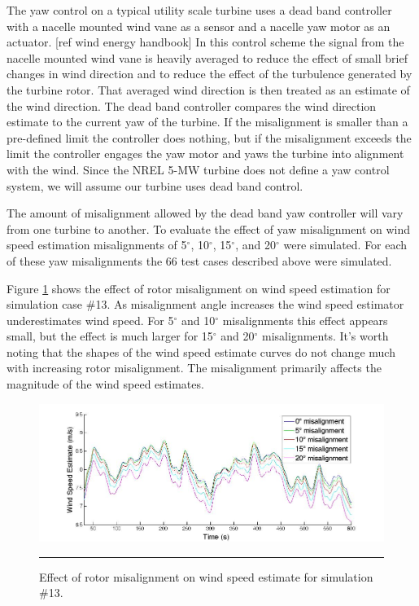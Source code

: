 The yaw control on a typical utility scale turbine uses a dead band controller with a nacelle mounted wind vane as a sensor and a nacelle yaw motor as an actuator. [ref wind energy handbook] In this control scheme the signal from the nacelle mounted wind vane is heavily averaged to reduce the effect of small brief changes in wind direction and to reduce the effect of the turbulence generated by the turbine rotor. That averaged wind direction is then treated as an estimate of the wind direction. The dead band controller compares the wind direction estimate to the current yaw of the turbine. If the misalignment is smaller than a pre-defined limit the controller does nothing, but if the misalignment exceeds the limit the controller engages the yaw motor and yaws the turbine into alignment with the wind. Since the NREL 5-MW turbine does not define a yaw control system, we will assume our turbine uses dead band control.

The amount of misalignment allowed by the dead band yaw controller will vary from one turbine to another. To evaluate the effect of yaw misalignment on wind speed estimation misalignments of 5$^\circ$, 10$^\circ$, 15$^\circ$, and 20$^\circ$ were simulated. For each of these yaw misalignments the 66 test cases described above were simulated.

Figure \ref{fig2-20} shows the effect of rotor misalignment on wind speed estimation for simulation case \#13. As misalignment angle increases the wind speed estimator underestimates wind speed. For 5$^\circ$ and 10$^\circ$ misalignments this effect appears small, but the effect is much larger for 15$^\circ$ and 20$^\circ$ misalignments. It’s worth noting that the shapes of the wind speed estimate curves do not change much with increasing rotor misalignment. The misalignment primarily affects the magnitude of the wind speed estimates. 


\begin{figure}[htbp]
	\centering
		\includegraphics[trim = {3cm 0 2.5cm 0}, clip, width = \linewidth]{Figures/ch2Figures/fig2-20.jpg}
		\rule{35em}{0.5pt}
	\caption{Effect of rotor misalignment on wind speed estimate for simulation \#13.}
	\label{fig2-20}
\end{figure}

